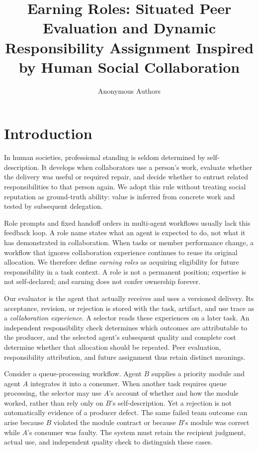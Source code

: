 \documentclass[sigconf,anonymous]{aamas}
\title[Earning Roles]{Earning Roles: Situated Peer Evaluation and Dynamic Responsibility Assignment Inspired by Human Social Collaboration}
\author{Anonymous Authors}
\affiliation{\institution{Anonymous Institution}}
\begin{document}
\maketitle

\section{Introduction}
In human societies, professional standing is seldom determined by self-description. It develops when collaborators use a person's work, evaluate whether the delivery was useful or required repair, and decide whether to entrust related responsibilities to that person again. We adopt this rule without treating social reputation as ground-truth ability: value is inferred from concrete work and tested by subsequent delegation.

Role prompts and fixed handoff orders in multi-agent workflows usually lack this feedback loop. A role name states what an agent is expected to do, not what it has demonstrated in collaboration. When tasks or member performance change, a workflow that ignores collaboration experience continues to reuse its original allocation. We therefore define \emph{earning roles} as acquiring eligibility for future responsibility in a task context. A role is not a permanent position; expertise is not self-declared; and earning does not confer ownership forever.

Our evaluator is the agent that actually receives and uses a versioned delivery. Its acceptance, revision, or rejection is stored with the task, artifact, and use trace as a \emph{collaboration experience}. A selector reads these experiences on a later task. An independent responsibility check determines which outcomes are attributable to the producer, and the selected agent's subsequent quality and complete cost determine whether that allocation should be repeated. Peer evaluation, responsibility attribution, and future assignment thus retain distinct meanings.

Consider a queue-processing workflow. Agent $B$ supplies a priority module and agent $A$ integrates it into a consumer. When another task requires queue processing, the selector may use $A$'s account of whether and how the module worked, rather than rely only on $B$'s self-description. Yet a rejection is not automatically evidence of a producer defect. The same failed team outcome can arise because $B$ violated the module contract or because $B$'s module was correct while $A$'s consumer was faulty. The system must retain the recipient judgment, actual use, and independent quality check to distinguish these cases.
\end{document}
